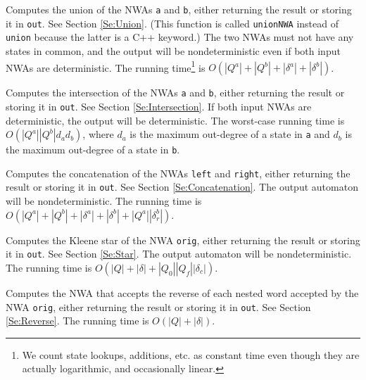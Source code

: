 \begin{functionlist}

    Computes the union of the NWAs \texttt{a} and \texttt{b},
    either returning the result or storing it in \texttt{out}.
    See Section
    \ref{Se:Union}. (This function is called \texttt{unionNWA} instead of
    \texttt{union} because the latter is a C++ keyword.) The two NWAs must not
    have any states in common, and the output will be nondeterministic even
    if both input NWAs are deterministic. The running time\footnote{We count
      state lookups, additions, etc. as constant time even though they are
      actually logarithmic, and occasionally linear.} is
    $O(|Q^a|+|Q^b|+|\delta^a|+|\delta^b|)$.

    Computes the intersection of the NWAs \texttt{a} and \texttt{b},
    either returning the result or storing it in \texttt{out}.
    See Section \ref{Se:Intersection}. If both input NWAs are deterministic,
    the output will be deterministic. The worst-case running time is
    $O(|Q^a| |Q^b| d_a d_b)$, where $d_a$ is the maximum out-degree
    of a state in \texttt{a} and $d_b$ is the maximum out-degree of a state
    in \texttt{b}.

    Computes the concatenation of the NWAs \texttt{left} and
    \texttt{right}, either returning the result or storing it in
    \texttt{out}.
    See Section \ref{Se:Concatenation}. The output automaton will be
    nondeterministic. The running time is
    $O(|Q^a|+|Q^b|+|\delta^a|+|\delta^b|+|Q^a||\delta_r^b|)$.

    Computes the Kleene star of the NWA \texttt{orig}, either
    returning the result or storing it in \texttt{out}. See Section
    \ref{Se:Star}. The output automaton will be nondeterministic. The
    running time is $O(|Q|+|\delta|+|Q_0||Q_f||\delta_c|)$.

    Computes the NWA that accepts the reverse of each nested word
    accepted by the NWA \texttt{orig}, either returning the result or
    storing it in \texttt{out}. See Section \ref{Se:Reverse}. The running
    time is $O(|Q|+|\delta|)$.


\end{functionlist}

